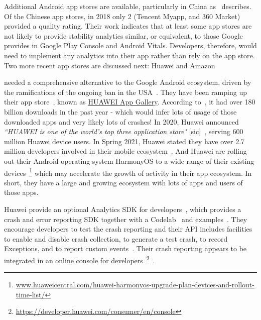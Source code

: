Additional Android app stores are available, particularly in China as~ describes. Of the Chinese app stores, in 2018 only 2 (Tencent Myapp, and 360 Market) provided a quality rating. Their work indicates that at least some app stores are not likely to provide stability analytics similar, or equivalent, to those Google provides in Google Play Console and Android Vitals. Developers, therefore, would need to implement any analytics into their app rather than rely on the app store. Two more recent app stores are discussed next: Huawei and Amazon

 needed a comprehensive alternative to the Google Android ecosystem, driven by the ramifications of the ongoing ban in the USA~. 
They have been ramping up their app store~, known as \href{https://appgallery.huawei.com/}{HUAWEI App Gallery}. According to~, it had over 180 billion downloads in the past year - which would infer lots of usage of those downloaded apps and very likely lots of crashes! 
%
In 2020, Huawei announced \emph{``HUAWEI is one of the world's top three application store"} [sic]~, serving 600 million Huawei device users. In Spring 2021, Huawei stated they have over 2.7 million developers involved in their mobile ecosystem~. 
And Huawei are rolling out their Android operating system HarmonyOS to a wide range of their existing devices~\footnote{\href{https://www.huaweicentral.com/huawei-harmonyos-upgrade-plan-devices-and-rollout-time-list/}{www.huaweicentral.com/huawei-harmonyos-upgrade-plan-devices-and-rollout-time-list/}} which may accelerate the growth of activity in their app ecosystem. In short, they have a large and growing ecosystem with lots of apps and users of those apps.

Huawei provide an optional Analytics SDK for developers~, which provides a crash and error reporting SDK together with a Codelab~ and examples~. They encourage developers to test the crash reporting and their API includes facilities to enable and disable crash collection, to generate a test crash, to record Exceptions, and to report custom events~. 
Their crash reporting appears to be integrated in an online console for developers~\footnote{\url{https://developer.huawei.com/consumer/en/console}}~. 

